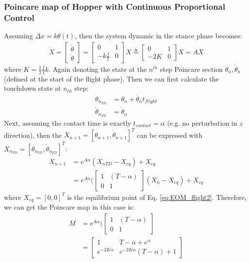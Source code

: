 \subsubsection{Poincare map of Hopper with Continuous Proportional Control}

Assuming $\Delta x = k\theta(t)$, then the system dynamic in the stance phase becomes:
\begin{align}
\label{eq:EOM_flight2}
\dot X = 
\begin{bmatrix}
\dot \theta  \\
\ddot \theta
\end{bmatrix} = \begin{bmatrix}
0 & 1 \\
-k\frac{f}{I} & 0
\end{bmatrix}X \triangleq \begin{bmatrix}
0 & 1 \\
-2K & 0
\end{bmatrix}X = AX
\end{align}
\noindent where $K =\frac{1}{2} \frac{f}{I}k$. Again denoting the state at the $n^{th}$ step Poincare section $\theta_n, \dot \theta_n$ (defined at the start of the flight phase). Then we can first calculate the touchdown state at $n_{th}$ step:
\begin{align}
\nonumber\theta_{n_{TD}} &= \theta_{n} + \dot \theta_{n}t_{flight}\\
\nonumber\dot \theta_{n_{TD}} &= \dot \theta_{n}
\end{align}
Next, assuming the contact time is exactly $t_{contact}= \alpha$ (e.g. no perturbation in $z$ direction), then the $X_{n+1} = [\theta_{n+1}, \dot \theta_{n+1}]^T$ can be expressed with $X_{n_{TD}} = [\theta_{n_{TD}}, \dot \theta_{n_{TD}}]^T$:
\begin{align}
X_{n+1} &= e^{A\alpha}(X_{n{TD}} - X_{eq}) +X_{eq} \\
        &= e^{A\alpha}(\begin{bmatrix}
        1 & (T-\alpha) \\
        0 & 1
        \end{bmatrix}(X_n -X_{eq}) + X_{eq}
\end{align}
where $X_{eq} = [0,0]^T$ is the equilibrium point of Eq. \ref{eq:EOM_flight2}. Therefore, we can get the Poincare map in this case is:
\begin{align}
M &=   e^{A\alpha}(\begin{bmatrix}
        1 & (T-\alpha) \\
        0 & 1
        \end{bmatrix}\\
   & =  \begin{bmatrix}
           1 & T-\alpha + e^{\alpha} \\
           e^{-2K\alpha} & e^{-2K\alpha}(T-\alpha)+1
           \end{bmatrix}
\end{align}

